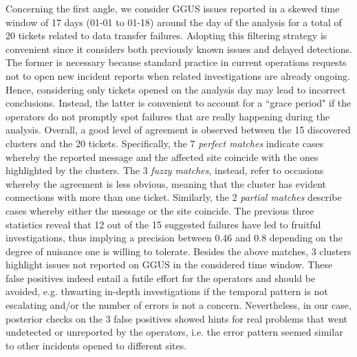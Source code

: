 Concerning the first angle, we consider GGUS issues reported in a skewed time window of 17 days (01-01 to 01-18) around the day of the analysis for a total of 20 tickets related to data transfer failures.
Adopting this filtering strategy is convenient since it considers both previously known issues and delayed detections.
The former is necessary because standard practice in current operations requests not to open new incident reports when related investigations are already ongoing. Hence, considering only tickets opened on the analysis day may lead to incorrect conclusions.
Instead, the latter is convenient to account for a ``grace period" if the operators do not promptly spot failures that are really happening during the analysis.
Overall, a good level of agreement is observed between the 15 discovered clusters and the 20 tickets.
Specifically, the 7 \textit{perfect matches} indicate cases whereby the reported message and the affected site coincide with the ones highlighted by the clusters.
The 3 \textit{fuzzy matches}, instead, refer to occasions whereby the agreement is less obvious, meaning that the cluster has evident connections with more than one ticket.
Similarly, the 2 \textit{partial matches} describe cases whereby either the message or the site coincide. 
The previous three statistics reveal that 12 out of the 15 suggested failures have led to fruitful investigations, thus implying a precision between 0.46 and 0.8 depending on the degree of nuisance one is willing to tolerate. 
Besides the above matches, 3 clusters highlight issues not reported on GGUS in the considered time window.
These false positives indeed entail a futile effort for the operators and should be avoided, e.g. thwarting in-depth investigations 
if the temporal pattern is not escalating and/or the number of errors is not a concern.
Nevertheless, in our case, posterior checks on the 3 false positives showed hints for real problems that went undetected or unreported by the operators, i.e. the error pattern seemed similar to other incidents opened to different sites.

